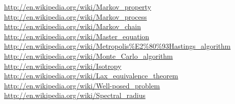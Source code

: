 \documentclass[11pt,english,a4paper]{article}
\begin{document}
\begin{flushleft}
\begin{thebibliography}{1}
\href{http://en.wikipedia.org/wiki/Markov\_property}{http://en.wikipedia.org/wiki/Markov\_property}
\href{http://en.wikipedia.org/wiki/Markov\_process}{http://en.wikipedia.org/wiki/Markov\_process}
\href{http://en.wikipedia.org/wiki/Markov\_chain}{http://en.wikipedia.org/wiki/Markov\_chain}
\href{http://en.wikipedia.org/wiki/Master\_equation}{http://en.wikipedia.org/wiki/Master\_equation}
\href{http://en.wikipedia.org/wiki/Metropolis\%E2\%80\%93Hastings\_algorithm}{http://en.wikipedia.org/wiki/Metropolis\%E2\%80\%93Hastings\_algorithm}
\href{http://en.wikipedia.org/wiki/Monte\_Carlo\_algorithm}{http://en.wikipedia.org/wiki/Monte\_Carlo\_algorithm}
\href{http://en.wikipedia.org/wiki/Isotropy}{http://en.wikipedia.org/wiki/Isotropy}
\href{http://en.wikipedia.org/wiki/Lax\_equivalence\_theorem}{http://en.wikipedia.org/wiki/Lax\_equivalence\_theorem}
\href{http://en.wikipedia.org/wiki/Well-posed\_problem}{http://en.wikipedia.org/wiki/Well-posed\_problem}
\href{http://en.wikipedia.org/wiki/Spectral\_radius}{http://en.wikipedia.org/wiki/Spectral\_radius}
\end{thebibliography}

\end{flushleft}
\end{document}
